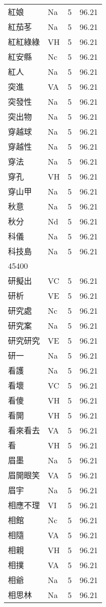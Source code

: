 \documentclass[twocolumn]{book}
\begin{document}
\begin{supertabular}{llrr}
紅娘 & Na & 5 &  96.21\\
紅茄苳 & Na & 5 &  96.21\\
紅紅綠綠 & VH & 5 &  96.21\\
紅安縣 & Nc & 5 &  96.21\\
紅人 & Na & 5 &  96.21\\
突進 & VA & 5 &  96.21\\
突發性 & Na & 5 &  96.21\\
突出物 & Na & 5 &  96.21\\
穿越球 & Na & 5 &  96.21\\
穿越性 & Na & 5 &  96.21\\
穿法 & Na & 5 &  96.21\\
穿孔 & VH & 5 &  96.21\\
穿山甲 & Na & 5 &  96.21\\
秋意 & Na & 5 &  96.21\\
秋分 & Nd & 5 &  96.21\\
科儀 & Na & 5 &  96.21\\
科技島 & Na & 5 &  96.21\\
45400\\
研擬出 & VC & 5 &  96.21\\
研析 & VE & 5 &  96.21\\
研究處 & Nc & 5 &  96.21\\
研究案 & Na & 5 &  96.21\\
研究研究 & VE & 5 &  96.21\\
研一 & Na & 5 &  96.21\\
看護 & Na & 5 &  96.21\\
看壞 & VC & 5 &  96.21\\
看傻 & VH & 5 &  96.21\\
看開 & VH & 5 &  96.21\\
看來看去 & VA & 5 &  96.21\\
看 & VH & 5 &  96.21\\
眉墨 & Na & 5 &  96.21\\
眉開眼笑 & VA & 5 &  96.21\\
眉宇 & Na & 5 &  96.21\\
相應不理 & VI & 5 &  96.21\\
相館 & Nc & 5 &  96.21\\
相隨 & VA & 5 &  96.21\\
相親 & VH & 5 &  96.21\\
相撲 & VA & 5 &  96.21\\
相爺 & Na & 5 &  96.21\\
相思林 & Na & 5 &  96.21\\

\end{supertabular}
\end{document}
